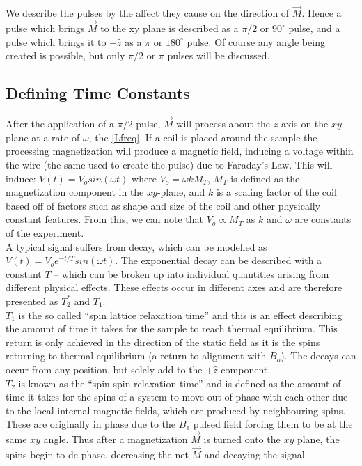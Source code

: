 We describe the pulses by the affect they cause on the direction of $\vec{M}$. Hence a pulse which brings $\vec{M}$ to the xy plane is described as a $\pi / 2$ or $90^\circ$ pulse, and a pulse which brings it to $-\hat{z}$ as a $\pi$ or $180^\circ$ pulse. Of course any angle being created is possible, but only $\pi/2$ or $\pi$ pulses will be discussed.

\subsection{Defining Time Constants}

After the application of a $\pi/2$ pulse, $\vec{M}$ will process about the $z$-axis on the $xy$-plane at a rate of $\omega$, the \ref{Lfreq}. If a coil is placed around the sample the processing magnetization will produce a magnetic field, inducing a voltage within the wire (the same used to create the pulse) due to Faraday's Law. This will induce: $V(t) = V_o sin(\omega t ) \text{ where } V_o = \omega k M_T$, $M_T$ is defined as the magnetization component in the $xy$-plane, and $k$ is a scaling factor of the coil based off of factors such as shape and size of the coil and other physically constant features. From this, we can note that $V_o \propto  M_T$ as $k$ and $\omega$ are constants of the experiment.\\

A typical signal suffers from decay, which can be modelled as $V(t) = V_o e^{-t/T} sin(\omega t)$. The exponential decay can be described with a constant $T$ -- which can be broken up into individual quantities arising from different physical effects. These effects occur in different axes and are therefore presented as $T^*_2$ and $T_1$.\\

$T_1$ is the so called ``spin lattice relaxation time'' and this is an effect describing the amount of time it takes for the sample to reach thermal equilibrium. This return is only achieved in the direction of the static field as it is the spins returning to thermal equilibrium (a return to alignment with $B_o$). The decays can occur from any position, but solely add to the $+\hat{z}$ component.\\

$T_2$ is known as the ``spin-spin relaxation time'' and is defined as the amount of time it takes for the spins of a system to move out of phase with each other due to the local internal magnetic fields, which are produced by neighbouring spins. These are originally in phase due to the $B_1$ pulsed field forcing them to be at the same $xy$ angle. Thus after a magnetization $\vec{M}$ is turned onto the $xy$ plane, the spins begin to de-phase, decreasing the net $\vec{M}$ and decaying the signal.

